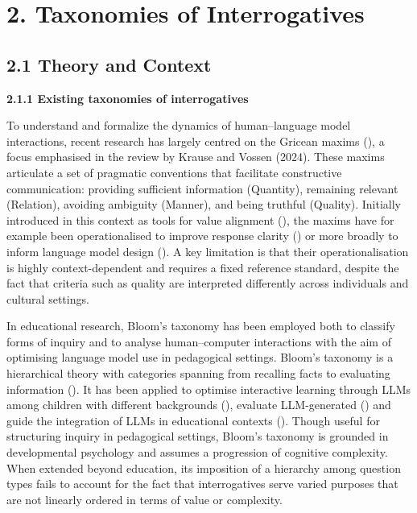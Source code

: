 \documentclass[
  12pt,
]{article}
\begin{document}
\section{2. Taxonomies of Interrogatives}\label{taxonomies-of-interrogatives}

\subsection{2.1 Theory and Context}\label{theory-and-context}

\textbf{2.1.1 Existing taxonomies of interrogatives}

To understand and formalize the dynamics of human--language model interactions, recent research has largely centred on the Gricean maxims (), a focus emphasised in the review by Krause and Vossen (2024). These maxims articulate a set of pragmatic conventions that facilitate constructive communication: providing sufficient information (Quantity), remaining relevant (Relation), avoiding ambiguity (Manner), and being truthful (Quality). Initially introduced in this context as tools for value alignment (), the maxims have for example been operationalised to improve response clarity () or more broadly to inform language model design (). A key limitation is that their operationalisation is highly context-dependent and requires a fixed reference standard, despite the fact that criteria such as quality are interpreted differently across individuals and cultural settings.

In educational research, Bloom's taxonomy has been employed both to classify forms of inquiry and to analyse human--computer interactions with the aim of optimising language model use in pedagogical settings. Bloom's taxonomy is a hierarchical theory with categories spanning from recalling facts to evaluating information (). It has been applied to optimise interactive learning through LLMs among children with different backgrounds (), evaluate LLM-generated () and guide the integration of LLMs in educational contexts (). Though useful for structuring inquiry in pedagogical settings, Bloom's taxonomy is grounded in developmental psychology and assumes a progression of cognitive complexity. When extended beyond education, its imposition of a hierarchy among question types fails to account for the fact that interrogatives serve varied purposes that are not linearly ordered in terms of value or complexity.
\end{document}
